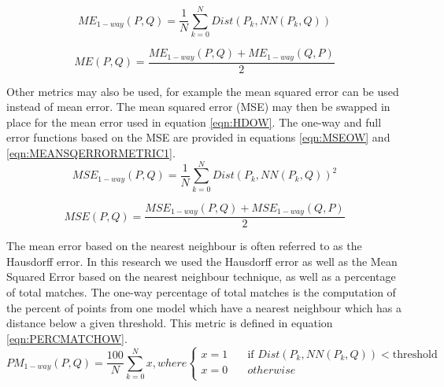 \begin{equation} \label{eqn:HDOW}
ME_{1-way}(P, Q) = \frac{1}{N}\sum_{k=0}^{N} Dist(P_k, NN(P_k, Q))
\end{equation}


\begin{equation} \label{eqn:MEANERRORMETRIC1}
ME(P, Q) = \frac{ME_{1-way}(P,Q) + ME_{1-way}(Q,P)}{2}
\end{equation}

Other metrics may also be used, for example the mean squared error can be used instead of mean error. The mean squared error (MSE) may then be swapped in place for the mean error used in equation \ref{eqn:HDOW}. The one-way and full error functions based on the MSE are provided in equations \ref{eqn:MSEOW} and \ref{eqn:MEANSQERRORMETRIC1}. \\


\begin{equation} \label{eqn:MSEOW}
MSE_{1-way}(P, Q) = \frac{1}{N}\sum_{k=0}^{N} Dist(P_k, NN(P_k, Q))^2
\end{equation}


\begin{equation} \label{eqn:MEANSQERRORMETRIC1}
MSE(P,Q) = \frac{MSE_{1-way}(P,Q) + MSE_{1-way}(Q,P)}{2}
\end{equation}


The mean error based on the nearest neighbour is often referred to as the Hausdorff error. In this research we used the Hausdorff error as well as the Mean Squared Error based on the nearest neighbour technique, as well as a percentage of total matches. The one-way percentage of total matches is the computation of the percent of points from one model which have a nearest neighbour which has a distance below a given threshold. This metric is defined in equation \ref{eqn:PERCMATCHOW}. \\

\begin{equation} \label{eqn:PERCMATCHOW}
PM_{1-way}(P, Q) = \frac{100}{N}\sum_{k=0}^{N} x, where
  \begin{cases}
    x=1       & \quad \text{if } Dist(P_k,NN(P_k,Q)) < \text{threshold}\\
    x=0  & \quad otherwise\\
  \end{cases}
\end{equation}

